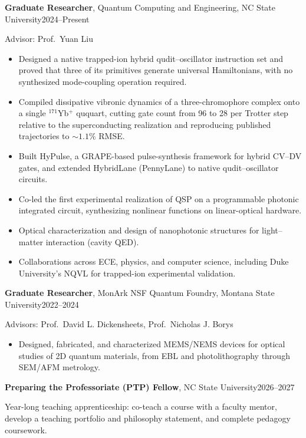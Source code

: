 \documentclass[10.5pt,letterpaper]{article}
\newcommand{\cvsec}[1]{%
  \par\needspace{4\baselineskip}\vspace{11pt}%
  \noindent\makebox[0pt][r]{%
    \smash{\parbox[t]{1.45in}{\raggedright\footnotesize\bfseries\MakeUppercase{#1}}}%
    \hspace{0.30in}}%
  \ignorespaces}
\newcommand{\entry}[2]{#1\hfill #2\par}
\begin{document}
\cvsec{Research\\Experience}
\entry{\textbf{Graduate Researcher}, Quantum Computing and Engineering, NC State University}{2024--Present}
Advisor: Prof.\ Yuan Liu
\begin{itemize}
  \item Designed a native trapped-ion hybrid qudit--oscillator instruction set and proved
  that three of its primitives generate universal Hamiltonians, with no synthesized
  mode-coupling operation required.
  \item Compiled dissipative vibronic dynamics of a three-chromophore complex onto a single
  $^{171}$Yb$^+$ ququart, cutting gate count from 96 to 28 per Trotter step relative to the
  superconducting realization and reproducing published trajectories to ${\sim}1.1\%$ RMSE.
  \item Built HyPulse, a GRAPE-based pulse-synthesis framework for hybrid CV--DV gates, and
  extended HybridLane (PennyLane) to native qudit--oscillator circuits.
  \item Co-led the first experimental realization of QSP on a programmable photonic
  integrated circuit, synthesizing nonlinear functions on linear-optical hardware.
  \item Optical characterization and design of nanophotonic structures for light--matter
  interaction (cavity QED).
  \item Collaborations across ECE, physics, and computer science, including Duke
  University's NQVL for trapped-ion experimental validation.
\end{itemize}

\vspace{5pt}
\entry{\textbf{Graduate Researcher}, MonArk NSF Quantum Foundry, Montana State University}{2022--2024}
Advisors: Prof.\ David L. Dickensheets, Prof.\ Nicholas J. Borys
\begin{itemize}
  \item Designed, fabricated, and characterized MEMS/NEMS devices for optical studies of
  2D quantum materials, from EBL and photolithography through SEM/AFM metrology.
\end{itemize}

\cvsec{Teaching\\Experience}
\entry{\textbf{Preparing the Professoriate (PTP) Fellow}, NC State University}{2026--2027}
Year-long teaching apprenticeship: co-teach a course with a faculty mentor, develop a teaching
portfolio and philosophy statement, and complete pedagogy coursework.
\end{document}
